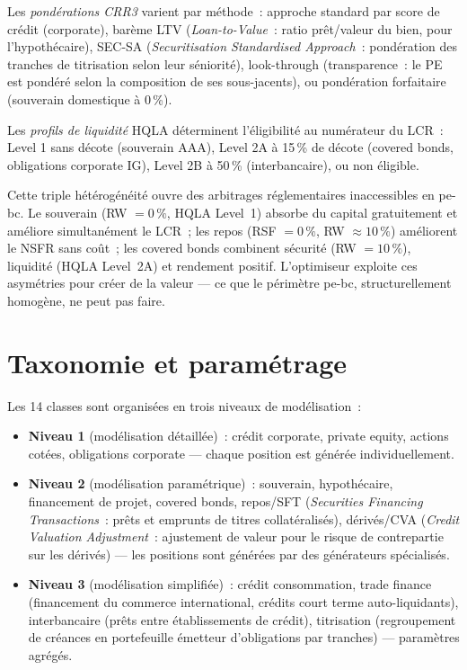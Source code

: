 \documentclass[10pt, a4paper, oneside]{report}
\theoremstyle{definition}
\begin{document}
Les \emph{pondérations CRR3} varient par méthode~: approche standard par score de crédit (corporate), barème LTV (\emph{Loan-to-Value}~: ratio prêt/valeur du bien, pour l'hypothécaire), SEC-SA (\emph{Securitisation Standardised Approach}~: pondération des tranches de titrisation selon leur séniorité), look-through (transparence~: le PE est pondéré selon la composition de ses sous-jacents), ou pondération forfaitaire (souverain domestique à 0\,\%).

Les \emph{profils de liquidité} HQLA déterminent l'éligibilité au numérateur du LCR~: Level 1 sans décote (souverain AAA), Level 2A à 15\,\% de décote (covered bonds, obligations corporate IG), Level 2B à 50\,\% (interbancaire), ou non éligible.

Cette triple hétérogénéité ouvre des arbitrages réglementaires inaccessibles en pe-bc. Le souverain (RW $= 0\,\%$, HQLA Level~1) absorbe du capital gratuitement et améliore simultanément le LCR~; les repos (RSF $= 0\,\%$, RW $\approx 10\,\%$) améliorent le NSFR sans coût~; les covered bonds combinent sécurité (RW $= 10\,\%$), liquidité (HQLA Level~2A) et rendement positif. L'optimiseur exploite ces asymétries pour créer de la valeur --- ce que le périmètre pe-bc, structurellement homogène, ne peut pas faire.


\section{Taxonomie et paramétrage}
\label{sec:ch3:taxonomie}

Les 14 classes sont organisées en trois niveaux de modélisation~:

\begin{itemize}[nosep]
  \item \textbf{Niveau 1} (modélisation détaillée)~: crédit corporate, private equity, actions cotées, obligations corporate --- chaque position est générée individuellement.
  \item \textbf{Niveau 2} (modélisation paramétrique)~: souverain, hypothécaire, financement de projet, covered bonds, repos/SFT (\emph{Securities Financing Transactions}~: prêts et emprunts de titres collatéralisés), dérivés/CVA (\emph{Credit Valuation Adjustment}~: ajustement de valeur pour le risque de contrepartie sur les dérivés) --- les positions sont générées par des générateurs spécialisés.
  \item \textbf{Niveau 3} (modélisation simplifiée)~: crédit consommation, trade finance (financement du commerce international, crédits court terme auto-liquidants), interbancaire (prêts entre établissements de crédit), titrisation (regroupement de créances en portefeuille émetteur d'obligations par tranches) --- paramètres agrégés.
\end{itemize}
\end{document}
